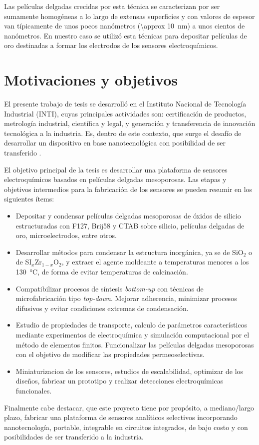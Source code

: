 			
		Las películas delgadas crecidas por esta técnica se caracterizan por ser sumamente homogéneas a lo largo de extensas superficies y con valores de espesor van típicamente de unos pocos nanómetros (\SI{\approx 10}{\nm}) a unos cientos de nanómetros. En nuestro caso se utilizó esta técnicas para depositar películas de oro destinadas a formar los electrodos de los sensores electroquímicos.

				

\section{Motivaciones y objetivos}

	El presente trabajo de tesis se desarrolló en el Instituto Nacional de Tecnología Industrial (INTI), cuyas principales actividades son: certificación de productos, metrología industrial, científica y legal, y generación y transferencia	de innovación tecnológica a la industria. Es, dentro de este contexto, que surge el desafío de desarrollar un dispositivo en base nanotecnológica con posibilidad de ser transferido . 

	El objetivo principal de la tesis es desarrollar una plataforma de sensores electroquímicos basados en películas delgadas mesoporosas. Las etapas y objetivos intermedios para la fabricación de los sensores se pueden resumir en los siguientes ítems:

	\begin{itemize}
		
		\item Depositar y condensar películas delgadas mesoporosas de óxidos de silicio estructuradas con F127, Brij58 y CTAB sobre silicio, películas delgadas de oro, microelectrodos, entre otros.  
		
		\item Desarrollar métodos para condensar la estructura inorgánica, ya se de SiO$_2$ o de SI$_{x}$Zr$_{1-x}$O$_2$, y extraer el agente moldeante a temperaturas menores a los \SI{130}{\celsius}, de forma de evitar temperaturas de calcinación. 

		\item Compatibilizar procesos de síntesis \textit{bottom-up} con técnicas de microfabricación tipo \textit{top-down}. Mejorar adherencia, minimizar procesos difusivos y evitar condiciones extremas de condensación.

		\item Estudio de propiedades de transporte, calculo de parámetros característicos mediante experimentos de electroquímica y simulación computacional por el método de elementos finitos. Funcionalizar las películas delgadas mesoporosas con el objetivo de modificar las propiedades permeoselectivas.

		\item Miniaturizacion de los sensores, estudios de escalabilidad, optimizar de los diseños, fabricar un prototipo y realizar detecciones electroquímicas funcionales.

		\end{itemize}	

	Finalmente cabe destacar, que este proyecto tiene por propósito, a mediano/largo plazo, fabricar una plataforma de sensores analíticos selectivos incorporando nanotecnología, portable, integrable en circuitos integrados, de bajo costo y con posibilidades de ser transferido a la industria.